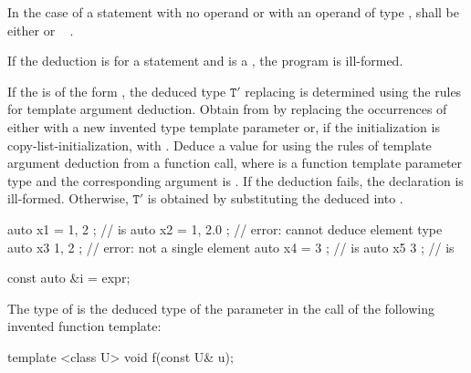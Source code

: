 In the case of a  statement with no operand
or with an operand of type ,
 shall be either
  or
\cv{}~ .

\pnum
If the deduction is for a  statement
and  is a ,
the program is ill-formed.

\pnum
If the  is of the form
 ,
the deduced type
$\mathtt{T}'$ replacing 
is determined using the rules for template argument deduction.
Obtain  from
 by replacing the occurrences of
  either with
a new invented type template parameter  or,
if the initialization is copy-list-initialization, with
. Deduce a value for  using the rules
of template argument deduction from a function call,
where  is a
function template parameter type and
the corresponding argument is .
If the deduction fails, the declaration is ill-formed.
Otherwise, $\mathtt{T}'$ is obtained by
substituting the deduced  into .
\begin{example}
\begin{codeblock}
auto x1 = { 1, 2 };             //  is 
auto x2 = { 1, 2.0 };           // error: cannot deduce element type
auto x3{ 1, 2 };                // error: not a single element
auto x4 = { 3 };                //  is 
auto x5{ 3 };                   //  is 
\end{codeblock}
\end{example}

\begin{example}
\begin{codeblock}
const auto &i = expr;
\end{codeblock}
The type of  is the deduced type of the parameter  in
the call  of the following invented function template:
\begin{codeblock}
template <class U> void f(const U& u);
\end{codeblock}
\end{example}

